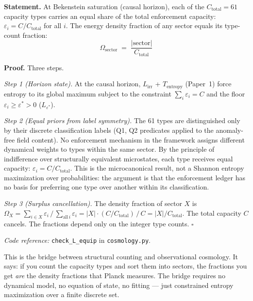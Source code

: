 \documentclass[11pt]{article}
\newcommand{\coderef}[2]{\smallskip\noindent\textit{Code reference:} \texttt{#1} in \texttt{#2}.}
\begin{document}
\begin{tcolorbox}[apfbox, title={$L_{\mathrm{equip}}$ (Horizon Equipartition)}]
\textbf{Statement.}  At Bekenstein saturation (causal horizon), each of the $C_{\mathrm{total}} = 61$ capacity types carries an equal share of the total enforcement capacity: $\varepsilon_i = C/C_{\mathrm{total}}$ for all $i$.  The energy density fraction of any sector equals its type-count fraction:
\begin{equation}
\Omega_{\mathrm{sector}} \;=\; \frac{|\mathrm{sector}|}{C_{\mathrm{total}}}
\label{eq:omega_equip}
\end{equation}

\smallskip\noindent\textbf{Proof.}  Three steps.

\textit{Step 1 (Horizon state).}  At the causal horizon, $L_{\mathrm{irr}}$ + $T_{\mathrm{entropy}}$ (Paper~1) force entropy to its global maximum subject to the constraint $\sum_i \varepsilon_i = C$ and the floor $\varepsilon_i \ge \varepsilon^* > 0$ ($L_{\varepsilon^*}$).

\textit{Step 2 (Equal priors from label symmetry).}  The 61 types are distinguished only by their discrete classification labels (Q1, Q2 predicates applied to the anomaly-free field content).  No enforcement mechanism in the framework assigns different dynamical weights to types within the same sector.  By the principle of indifference over structurally equivalent microstates, each type receives equal capacity: $\varepsilon_i = C / C_{\mathrm{total}}$.  This is the microcanonical result, not a Shannon entropy maximization over probabilities: the argument is that the enforcement ledger has no basis for preferring one type over another within its classification.

\textit{Step 3 (Surplus cancellation).}  The density fraction of sector $X$ is $\Omega_X = \sum_{i \in X} \varepsilon_i \,/\, \sum_{\mathrm{all}\,i} \varepsilon_i = |X| \cdot (C/C_{\mathrm{total}}) \,/\, C = |X|/C_{\mathrm{total}}$.  The total capacity $C$ cancels.  The fractions depend only on the integer type counts.  $\square$

\coderef{check\_L\_equip}{cosmology.py}
\end{tcolorbox}

This is the bridge between structural counting and observational cosmology.  It says: if you count the capacity types and sort them into sectors, the fractions you get \emph{are} the density fractions that Planck measures.  The bridge requires no dynamical model, no equation of state, no fitting --- just constrained entropy maximization over a finite discrete set.
\end{document}

